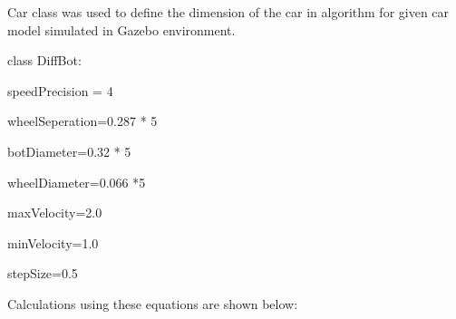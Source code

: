 \documentclass[12pt,a4paper]{article}
\begin{document}
\begin{itemize}
        Car class was used to define the dimension of the car in algorithm for given car model simulated in Gazebo environment.
        \par
        class  DiffBot:       \par
            speedPrecision = 4\par
            wheelSeperation=0.287 * 5          \par
            botDiameter=0.32 * 5 \par
            wheelDiameter=0.066 *5\par
            maxVelocity=2.0\par
            minVelocity=1.0\par
            stepSize=0.5\par
        Calculations using these equations are shown below:


\end{itemize}
\end{document}
